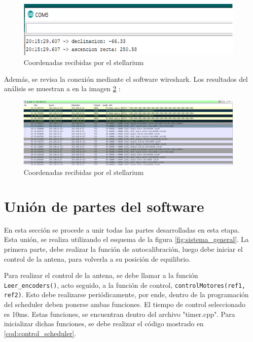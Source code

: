 \begin{figure}[ht!]
	\includegraphics{puerto_comm_stellarium}
	\caption{Coordenadas recibidas por el stellarium}
	\label{fig:coord_test_stell}
\end{figure}


Además, se revisa la conexión mediante el software wireshark. Los resultados del análisis se muestran a en la imagen 	\ref{fig:wireshark_stell} : 



\begin{figure}[ht!]
	\includegraphics[width=\linewidth]{wireshark_stellarium}
	\caption{Coordenadas recibidas por el stellarium}
	\label{fig:wireshark_stell}
\end{figure}

\section{Unión de partes del software} 

En esta sección se procede a unir todas las partes desarrolladas en esta etapa. Esta unión, se realiza utilizando el esquema de la figura \ref{fig:sistema_general}. La primera parte, debe realizar la función de autocalibración, luego debe iniciar el control de la antena, para volverla a su posición de equilibrio.  

Para realizar el control de la antena, se debe llamar a la función \texttt{Leer_encoders()}, acto seguido, a la función de control, \texttt{controlMotores(ref1, ref2)}. Esto debe realizarse periódicamente, por ende, dentro de la programación del scheduler deben ponerse ambas funciones. El tiempo de control seleccionado es 10ms. Estas funciones, se encuentran dentro del archivo "timer.cpp". Para inicializar dichas funciones, se debe realizar el código mostrado en \ref{cod:control_scheduler}. 

